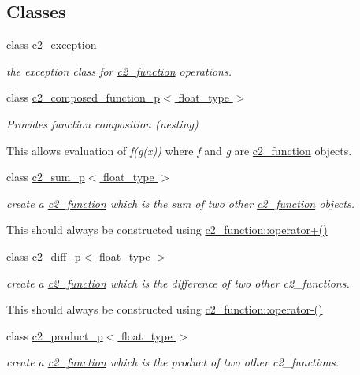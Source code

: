 \subsection*{Classes}
\begin{DoxyCompactItemize}
\item 
class \hyperlink{classc2__exception}{c2\+\_\+exception}
\begin{DoxyCompactList}\small\item\em the exception class for \hyperlink{classc2__function}{c2\+\_\+function} operations. \end{DoxyCompactList}\item 
class \hyperlink{classc2__composed__function__p}{c2\+\_\+composed\+\_\+function\+\_\+p$<$ float\+\_\+type $>$}
\begin{DoxyCompactList}\small\item\em Provides function composition (nesting)

This allows evaluation of {\itshape f(g(x))} where {\itshape f} and {\itshape g} are \hyperlink{classc2__function}{c2\+\_\+function} objects. \end{DoxyCompactList}\item 
class \hyperlink{classc2__sum__p}{c2\+\_\+sum\+\_\+p$<$ float\+\_\+type $>$}
\begin{DoxyCompactList}\small\item\em create a \hyperlink{classc2__function}{c2\+\_\+function} which is the sum of two other \hyperlink{classc2__function}{c2\+\_\+function} objects.

This should always be constructed using \hyperlink{classc2__function_a268b206b47c55e635e5f0a9e0f3e8ded}{c2\+\_\+function\+::operator+()} \end{DoxyCompactList}\item 
class \hyperlink{classc2__diff__p}{c2\+\_\+diff\+\_\+p$<$ float\+\_\+type $>$}
\begin{DoxyCompactList}\small\item\em create a \hyperlink{classc2__function}{c2\+\_\+function} which is the difference of two other c2\+\_\+functions.

This should always be constructed using \hyperlink{classc2__function_a4c56a4673e00bfad37143c403a0c94c8}{c2\+\_\+function\+::operator-\/()} \end{DoxyCompactList}\item 
class \hyperlink{classc2__product__p}{c2\+\_\+product\+\_\+p$<$ float\+\_\+type $>$}
\begin{DoxyCompactList}\small\item\em create a \hyperlink{classc2__function}{c2\+\_\+function} which is the product of two other c2\+\_\+functions.


\end{DoxyCompactList}
\end{DoxyCompactItemize}

